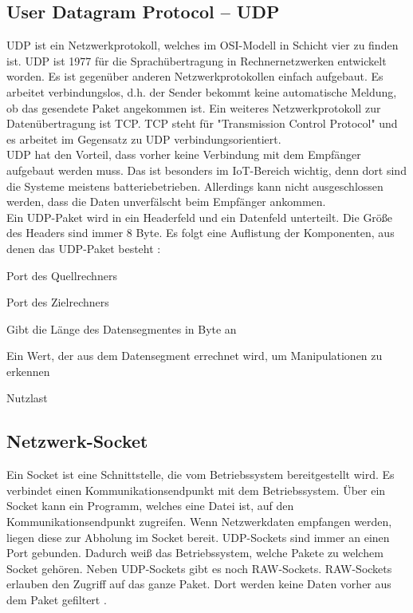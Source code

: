 \subsection{User Datagram Protocol -- UDP}
UDP ist ein Netzwerkprotokoll, welches im OSI-Modell in Schicht vier zu finden ist. UDP ist 1977 für die Sprachübertragung in Rechnernetzwerken entwickelt worden. Es ist gegenüber anderen Netzwerkprotokollen einfach aufgebaut. Es arbeitet verbindungslos, d.h. der Sender bekommt keine automatische Meldung, ob das gesendete Paket angekommen ist. Ein weiteres Netzwerkprotokoll zur Datenübertragung ist TCP. TCP steht für "Transmission Control Protocol" und es arbeitet im Gegensatz zu UDP verbindungsorientiert.
\\
UDP hat den Vorteil, dass vorher keine Verbindung mit dem Empfänger aufgebaut werden muss. Das ist besonders im IoT-Bereich wichtig, denn dort sind die Systeme meistens batteriebetrieben. Allerdings kann nicht ausgeschlossen werden, dass die Daten unverfälscht beim Empfänger ankommen.
\\
Ein UDP-Paket wird in ein Headerfeld und ein Datenfeld unterteilt. Die Größe des Headers sind immer 8 Byte. Es folgt eine Auflistung der Komponenten, aus denen das UDP-Paket besteht \cite{src_UDP}:
\\
\begin{description}[style=multiline,leftmargin=3cm]
\item [Quellport] Port des Quellrechners
\item [Zielport] Port des Zielrechners
\item [Länge] Gibt die Länge des Datensegmentes in Byte an
\item [Prüfsumme] Ein Wert, der aus dem Datensegment errechnet wird, um Manipulationen zu erkennen
\item [Daten] Nutzlast
\end{description}

\subsection{Netzwerk-Socket}
Ein Socket ist eine Schnittstelle, die vom Betriebssystem bereitgestellt wird. Es verbindet einen Kommunikationsendpunkt mit dem Betriebssystem. Über ein Socket kann ein Programm, welches eine Datei ist, auf den Kommunikationsendpunkt zugreifen. Wenn Netzwerkdaten empfangen werden, liegen diese zur Abholung im Socket bereit.
UDP-Sockets sind immer an einen Port gebunden. Dadurch weiß das Betriebssystem, welche Pakete zu welchem Socket gehören. Neben UDP-Sockets gibt es noch RAW-Sockets. RAW-Sockets erlauben den Zugriff auf das ganze Paket. Dort werden keine Daten vorher aus dem Paket gefiltert \cite{src_SOCKET}.

